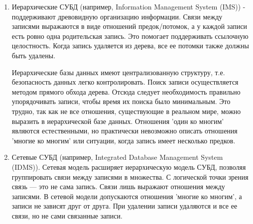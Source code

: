 \documentclass[12pt,a4paper,oneside]{article} %
\begin{document}
\begin{enumerate}
\item Иерархические СУБД (например, Information Management System (IMS)) \linebreak
- поддерживают древовидную организацию информации. Связи между записями \linebreak
выражаются в виде отношений предок/потомок, а у каждой записи есть \linebreak
ровно одна родительская запись. Это помогает поддерживать ссылочную \linebreak
целостность. Когда запись удаляется из дерева, все ее потомки также \linebreak
должны быть удалены.

Иерархические базы данных имеют централизованную структуру, \linebreak
т.е. безопасность данных легко контролировать. Поиск записи \linebreak
осуществляется методом прямого обхода дерева. Отсюда следует \linebreak
необходимость правильно упорядочивать записи, чтобы время их \linebreak
поиска было минимальным. Это трудно, так как не все отношения, \linebreak
существующие в реальном мире, можно выразить в иерархической \linebreak
базе данных. Отношения 'один ко многим' являются естественными, \linebreak
но практически невозможно описать отношения 'многие ко многим' \linebreak
или ситуации, когда запись имеет несколько предков.

\item Сетевые СУБД (например, Integrated Database Management \linebreak
System (IDMS)). Сетевая модель расширяет иерархическую модель СУБД, \linebreak
позволяя группировать связи между записями в множества. С \linebreak
логической точки зрения связь — это не сама запись. Связи лишь \linebreak
выражают отношения между записями. В сетевой модели допускаются \linebreak
отношения 'многие ко многим', а записи не зависят друг от \linebreak
друга. При удалении записи удаляются и все ее связи, но не сами \linebreak
связанные записи.


\end{enumerate}
\end{document}
